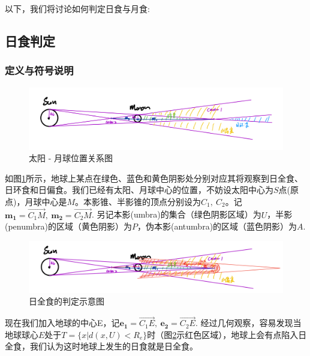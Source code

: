 \documentclass[hidelinks]{article}
\begin{document}
\vspace{10pt}


以下，我们将讨论如何判定日食与月食:

\subsection{日食判定}
\subsubsection{定义与符号说明}
\begin{figure}[H]
    \centering
    \includegraphics[width=0.8\linewidth]{images/sun_moon_pos.jpg}
    \caption{太阳 - 月球位置关系图}
    \label{fig:sun_moon_rela}
\end{figure}

如图\ref{fig:sun_moon_rela}所示，地球上某点在绿色、蓝色和黄色阴影处分别对应其将观察到日全食、日环食和日偏食。我们已经有太阳、月球中心的位置，不妨设太阳中心为$S$点(原点)，月球中心是$M$。本影锥、半影锥的顶点分别设为$C_1,\ C_2$。记$\mathbf{m_1} = \overrightarrow{C_1M},\ \mathbf{m_2} = \overrightarrow{C_2M}$. 另记本影(umbra)的集合（绿色阴影区域）为$U$，半影(penumbra)的区域（黄色阴影）为$P$，伪本影(antumbra)的区域（蓝色阴影）为$A$. 

\begin{figure}[H]
    \centering
    \includegraphics[width=0.8\linewidth]{images/image.png}
    \caption{日全食的判定示意图}
    \label{fig:total_eclipse_deter}
\end{figure}

现在我们加入地球的中心E，记$\mathbf{e_1} = \overrightarrow{C_1E},\ \mathbf{e_2} = \overrightarrow{C_2 E}$. 经过几何观察，容易发现当地球球心$E$处于$T = \{x| d(x, U) < R_e\}$时（图\ref{fig:total_eclipse_deter}示红色区域），地球上会有点陷入日全食，我们认为这时地球上发生的日食就是日全食。
\end{document}
